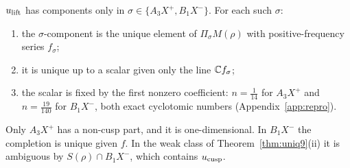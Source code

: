 \begin{proposition}\label{prop:U5}
$u_{\rm lift}$ has components only in $\sigma\in\{A_3X^+,B_1X^-\}$. For each such $\sigma$:
\begin{enumerate}[label=(\roman*)]
\item the $\sigma$-component is the unique element of $\Pi_\sigma M(\rho)$ with positive-frequency series $f_\sigma$;
\item it is unique up to a scalar given only the line $\mathbb{C} f_\sigma$;
\item the scalar is fixed by the first nonzero coefficient: $n=\tfrac1{14}$ for $A_3X^+$ and $n=\tfrac{19}{140}$ for $B_1X^-$, both exact cyclotomic numbers (Appendix~\ref{app:repro}).
\end{enumerate}
Only $A_3X^+$ has a non-cusp part, and it is one-dimensional. In $B_1X^-$ the completion is unique given $f$. In the weak class of Theorem~\ref{thm:uniq9}(ii) it is ambiguous by $S(\rho)\cap B_1X^-$, which contains $u_{\rm cusp}$.
\end{proposition}
